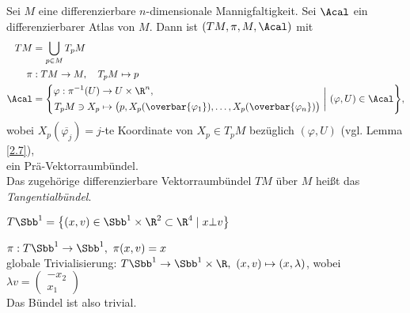 \begin{exmp}
	Sei $M$ eine differenzierbare $n$-dimensionale Mannigfaltigkeit. Sei $\Acal$ ein differenzierbarer Atlas von $M$. Dann ist $(TM, \pi, M, \Acal)$ mit
	\begin{align*}
		TM &= \bigcup_{p \in M} T_pM\\
		\pi&: TM \to M,\quad T_pM \mapsto p\\
		\Acal&= \Bigg\{ \begin{aligned}
			\varphi: \pi^{-1}(U) &\to U\times \R^n,\\
			 T_pM \ni X_p &\mapsto \big( p, X_p(\overbar{\varphi_1}), \dotsc, X_p(\overbar{\varphi_n}) \big)
		\end{aligned} \ \bigg|\ (\varphi,U) \in \Acal \Bigg\},
	\end{align*}
	wobei $ X_p (\overbar{\varphi_j}) = j $-te Koordinate von $X_p \in T_pM$ bezüglich $(\varphi,U)$ (vgl. Lemma \ref{2.7}),\\
	ein Prä-Vektorraumbündel.\\
	Das zugehörige differenzierbare Vektorraumbündel $TM$ über $M$ heißt das \emph{Tangentialbündel}. 
\end{exmp}

\begin{exmp*}
	$ T\Sbb^1 = \big\{(x,v) \in \Sbb^1 \times \R^2 \subset \R^4 \mid x \bot v \big\} $\\
	\begin{minipage}{\linewidth}
		\begin{wrapfigure}{R}{4cm}
			\centering
		\end{wrapfigure}
		$ \pi: T\Sbb^1 \to \Sbb^1,\ \pi(x,v) = x $\\
		globale Trivialisierung: $ T\Sbb^1 \to \Sbb^1 \times \R,\ (x,v) \mapsto (x,\lambda) $, wobei $\lambda v = \begin{pmatrix}
			-x_2\\x_1
		\end{pmatrix}$\\
		Das Bündel ist also trivial.
	\end{minipage}
\end{exmp*}

